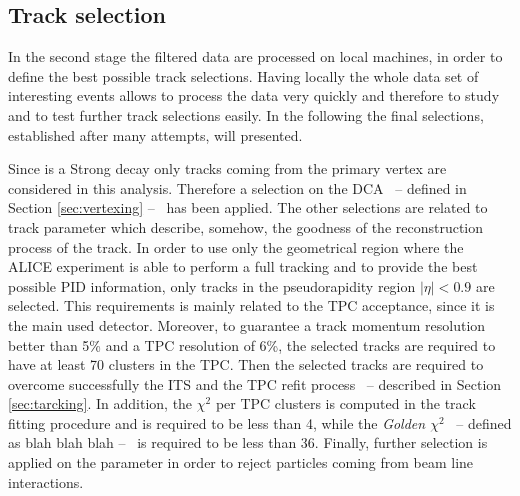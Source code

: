 %
\subsection{Track selection}

In the second stage the filtered data are processed on local machines, in order to define
the best possible track selections.
Having locally the whole data set of interesting events allows to process the data very 
quickly and therefore to study and to test further track selections easily.
In the following the final selections, established after many attempts, will presented.

Since \dstdecay is a Strong decay only tracks coming from the primary vertex are 
considered in this analysis. Therefore a selection on the DCA \ -- defined in Section
\ref{sec:vertexing} -- \ has been applied. 
The other selections are related to track parameter which describe, somehow, the goodness of the
reconstruction process of the track. 
In order to use only the geometrical region where the ALICE experiment is able to perform a full
tracking and to provide the best possible PID information, only tracks in the pseudorapidity 
region $|\eta| < 0.9 $ are selected. This requirements is mainly related to the TPC acceptance,
since it is the main used detector. 
Moreover, to guarantee a track momentum resolution better than 5\% and a TPC \dedx resolution of
6\%, the selected tracks are required to have at least 70 clusters in the TPC.
Then the selected tracks are required to overcome successfully the ITS and the TPC refit process
\ -- described in Section \ref{sec:tarcking}.
In addition, the $\chi^{2}$ per TPC clusters is computed in the track fitting procedure and is
required to be less than 4, while the \textit{Golden $\chi^{2}$} \ -- defined as blah blah blah -- 
\ is required to be less than 36.
Finally, further selection is applied on the  parameter in order to reject
particles coming from beam line interactions.

